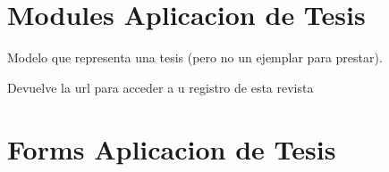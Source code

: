 \documentclass[letterpaper,10pt,spanish]{sphinxmanual}
\begin{document}
\section{Modules Aplicacion de Tesis}
\label{\detokenize{modules/tesis/models:module-tesis.models}}\label{\detokenize{modules/tesis/models:modules-aplicacion-de-tesis}}\label{\detokenize{modules/tesis/models::doc}}

\begin{fulllineitems}
\label{\detokenize{modules/tesis/models:tesis.models.Tesis}}
Modelo que representa una tesis (pero no un ejemplar para prestar).

\begin{fulllineitems}
\label{\detokenize{modules/tesis/models:tesis.models.Tesis.DoesNotExist}}
\end{fulllineitems}


\begin{fulllineitems}
\label{\detokenize{modules/tesis/models:tesis.models.Tesis.MultipleObjectsReturned}}
\end{fulllineitems}


\begin{fulllineitems}
\label{\detokenize{modules/tesis/models:tesis.models.Tesis.get_absolute_url}}
Devuelve la url para acceder a u registro de esta revista

\end{fulllineitems}


\end{fulllineitems}



\section{Forms Aplicacion de Tesis}
\label{\detokenize{modules/tesis/forms:module-tesis.forms}}\label{\detokenize{modules/tesis/forms:forms-aplicacion-de-tesis}}\label{\detokenize{modules/tesis/forms::doc}}
\end{document}
